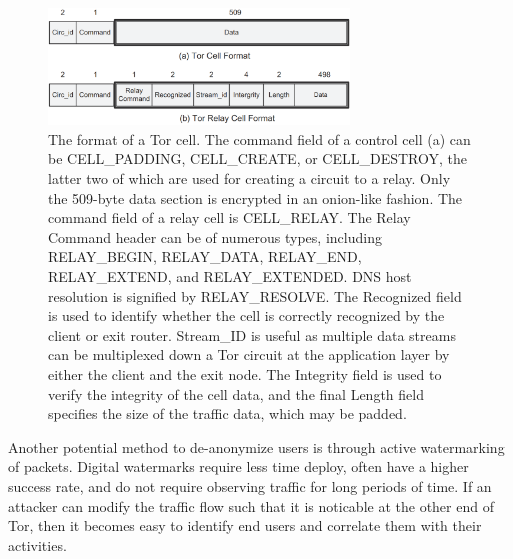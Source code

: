 \documentclass[journal]{IEEEtran}
\begin{document}
\begin{figure}[htbp]
\centering
\begin{minipage}{8 cm}
    \includegraphics[width=80mm]{resources/tor-cell-format.png}
    \caption{The format of a Tor cell. The command field of a control cell (a) can be CELL\_PADDING, CELL\_CREATE, or CELL\_DESTROY, the latter two of which are used for creating a circuit to a relay. Only the 509-byte data section is encrypted in an onion-like fashion. \newline\hspace*{2em} The command field of a relay cell is CELL\_RELAY. The Relay Command header can be of numerous types, including RELAY\_BEGIN, RELAY\_DATA, RELAY\_END, RELAY\_EXTEND, and RELAY\_EXTENDED. DNS host resolution is signified by RELAY\_RESOLVE. The Recognized field is used to identify whether the cell is correctly recognized by the client or exit router. Stream\_ID is useful as multiple data streams can be multiplexed down a Tor circuit at the application layer by either the client and the exit node. The Integrity field is used to verify the integrity of the cell data, and the final Length field specifies the size of the traffic data, which may be padded.}
\end{minipage}
\end{figure}

Another potential method to de-anonymize users is through active watermarking of packets. Digital watermarks require less time deploy, often have a higher success rate, and do not require observing traffic for long periods of time. If an attacker can modify the traffic flow such that it is noticable at the other end of Tor, then it becomes easy to identify end users and correlate them with their activities.
\end{document}

